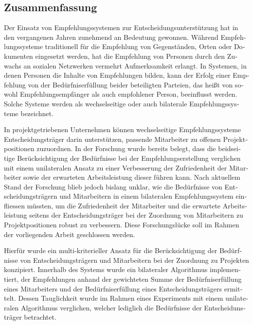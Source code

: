 \begin{otherlanguage}{ngerman}
\chapter*{Zusammenfassung}
Der Einsatz von Empfehlungssystemen zur Entscheidungsunterstützung hat in den vergangenen Jahren zunehmend an Bedeutung gewonnen.
Während Empfehlungssysteme traditionell für die Empfehlung von Gegenständen, Orten oder Dokumenten eingesetzt werden, hat die Empfehlung von Personen durch den Zuwachs an sozialen Netzwerken vermehrt Aufmerksamkeit erlangt.
In Systemen, in denen Personen die Inhalte von Empfehlungen bilden, kann der Erfolg einer Empfehlung von der Bedürfniserfüllung beider beteiligten Parteien, das heißt von sowohl Empfehlungsempfänger als auch empfohlener Person, beeinflusst werden.
Solche Systeme werden als wechselseitige oder auch bilaterale Empfehlungssysteme bezeichnet.

In projektgetriebenen Unternehmen können wechselseitige Empfehlungssysteme Entscheidungsträger darin unterstützen, passende Mitarbeiter zu offenen Projektpositionen zuzuordnen.
In der Forschung wurde bereits belegt, dass die beidseitige Berücksichtigung der Bedürfnisse bei der Empfehlungserstellung verglichen mit einem unilateralen Ansatz zu einer Verbesserung der Zufriedenheit der Mitarbeiter sowie der erwarteten Arbeitsleistung dieser führen kann.
Nach aktuellem Stand der Forschung blieb jedoch bislang unklar, wie die Bedürfnisse von Entscheidungsträgern und Mitarbeitern in einem bilateralen Empfehlungssystem einfliessen müssten, um die Zufriedenheit der Mitarbeiter und die erwartete Arbeitsleistung seitens der Entscheidungsträger bei der Zuordnung von Mitarbeitern zu Projektpositionen robust zu verbessern.
Diese Forschungslücke soll im Rahmen der vorliegenden Arbeit geschlossen werden.

Hierfür wurde ein multi-kriterieller Ansatz für die Berücksichtigung der Bedürfnisse von Entscheidungsträgern und Mitarbeitern bei der Zuordnung zu Projekten konzipiert.
Innerhalb des Systems wurde ein bilateraler Algorithmus implementiert, der Empfehlungen anhand der gewichteten Summe der Bedürfniserfüllung eines Mitarbeiters und der Bedürfniserfüllung eines Entscheidungsträgers ermittelt.
Dessen Tauglichkeit wurde im Rahmen eines Experiments mit einem unilateralen Algorithmus verglichen, welcher lediglich die Bedürfnisse der Entscheidunsträger betrachtet.


\end{otherlanguage}
